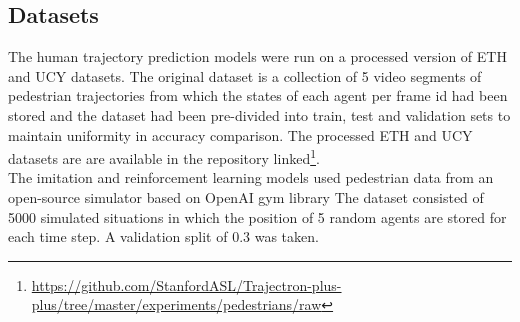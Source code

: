 \subsection{Datasets}
The human trajectory prediction models were run on a processed version of ETH and UCY datasets. The original dataset is a collection of 5 video segments of pedestrian trajectories from which the states of each agent per frame id had been stored and the dataset had been pre-divided into train, test and validation sets to maintain uniformity in accuracy comparison. The processed ETH and UCY datasets are are available in the repository linked\footnote{\href{https://github.com/StanfordASL/Trajectron-plus-plus/tree/master/experiments/pedestrians/raw}{https://github.com/StanfordASL/Trajectron-plus-plus/tree/master/experiments/pedestrians/raw}}.\\
The imitation and reinforcement learning models used pedestrian data from an open-source simulator based on OpenAI gym library %
The dataset consisted of 5000 simulated situations in which the position of 5 random agents are stored for each time step. A validation split of 0.3 was taken. 


